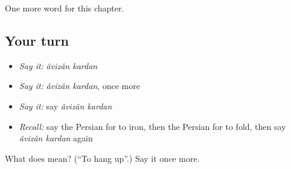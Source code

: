 \begin{grammarlens}[title={What you've built}]
One more word for this chapter.
\end{grammarlens}

\subsection*{Your turn}
\begin{itemize}
\raggedright
  \item \emph{Say it:} \emph{âvizân kardan}
  \item \emph{Say it:} \emph{âvizân kardan}, once more
  \item \emph{Say it:} say \emph{âvizân kardan}
  \item \emph{Recall:} say the Persian for to iron, then the Persian for to fold, then say \emph{âvizân kardan} again
\end{itemize}

\begin{tcolorbox}[breakable,colback=teal!4,colframe=teal!35!black,title={Before you move on}]
What does   mean? (\textquotedblleft{}To hang up\textquotedblright{}.) Say it once more.
\end{tcolorbox}
